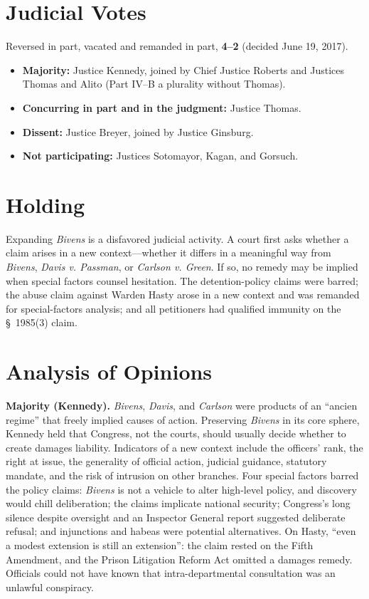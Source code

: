\documentclass[12pt]{article}
\begin{document}
\section{Judicial Votes}

Reversed in part, vacated and remanded in part, \textbf{4--2} (decided June 19, 2017).
\begin{itemize}
\item \textbf{Majority:} Justice Kennedy, joined by Chief Justice Roberts and Justices Thomas and Alito (Part IV--B a plurality without Thomas).
\item \textbf{Concurring in part and in the judgment:} Justice Thomas.
\item \textbf{Dissent:} Justice Breyer, joined by Justice Ginsburg.
\item \textbf{Not participating:} Justices Sotomayor, Kagan, and Gorsuch.
\end{itemize}

\section{Holding}

Expanding \textit{Bivens} is a disfavored judicial activity. A court first asks whether a claim arises in a new context---whether it differs in a meaningful way from \textit{Bivens}, \textit{Davis v. Passman}, or \textit{Carlson v. Green}. If so, no remedy may be implied when special factors counsel hesitation. The detention-policy claims were barred; the abuse claim against Warden Hasty arose in a new context and was remanded for special-factors analysis; and all petitioners had qualified immunity on the \S~1985(3) claim.

\section{Analysis of Opinions}

\textbf{Majority (Kennedy).} \textit{Bivens}, \textit{Davis}, and \textit{Carlson} were products of an ``ancien regime'' that freely implied causes of action. Preserving \textit{Bivens} in its core sphere, Kennedy held that Congress, not the courts, should usually decide whether to create damages liability. Indicators of a new context include the officers' rank, the right at issue, the generality of official action, judicial guidance, statutory mandate, and the risk of intrusion on other branches. Four special factors barred the policy claims: \textit{Bivens} is not a vehicle to alter high-level policy, and discovery would chill deliberation; the claims implicate national security; Congress's long silence despite oversight and an Inspector General report suggested deliberate refusal; and injunctions and habeas were potential alternatives. On Hasty, ``even a modest extension is still an extension'': the claim rested on the Fifth Amendment, and the Prison Litigation Reform Act omitted a damages remedy. Officials could not have known that intra-departmental consultation was an unlawful conspiracy.
\end{document}
